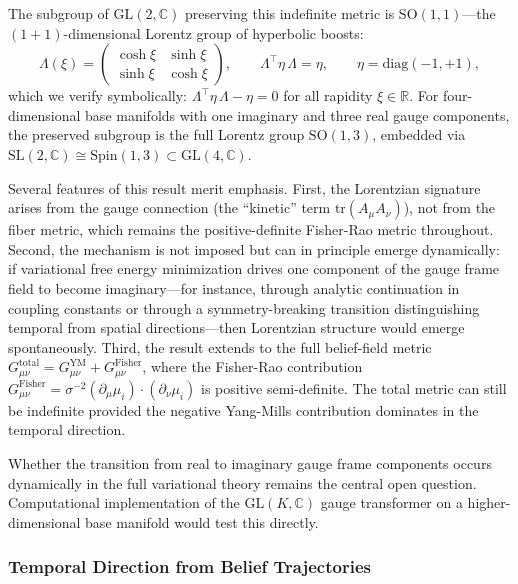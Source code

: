 \documentclass[11pt]{article}
\begin{document}
The subgroup of $\mathrm{GL}(2, \mathbb{C})$ preserving this indefinite metric is $\mathrm{SO}(1,1)$---the $(1{+}1)$-dimensional Lorentz group of hyperbolic boosts:
\begin{equation}
\Lambda(\xi) = \begin{pmatrix} \cosh\xi & \sinh\xi \\ \sinh\xi & \cosh\xi \end{pmatrix}, \qquad \Lambda^\top \eta\,\Lambda = \eta, \qquad \eta = \mathrm{diag}(-1, +1),
\end{equation}
which we verify symbolically: $\Lambda^\top \eta\,\Lambda - \eta = 0$ for all rapidity $\xi \in \mathbb{R}$. For four-dimensional base manifolds with one imaginary and three real gauge components, the preserved subgroup is the full Lorentz group $\mathrm{SO}(1,3)$, embedded via $\mathrm{SL}(2, \mathbb{C}) \cong \mathrm{Spin}(1,3) \subset \mathrm{GL}(4, \mathbb{C})$.

Several features of this result merit emphasis. First, the Lorentzian signature arises from the gauge connection (the ``kinetic'' term $\mathrm{tr}(A_\mu A_\nu)$), not from the fiber metric, which remains the positive-definite Fisher-Rao metric throughout. Second, the mechanism is not imposed but can in principle emerge dynamically: if variational free energy minimization drives one component of the gauge frame field to become imaginary---for instance, through analytic continuation in coupling constants or through a symmetry-breaking transition distinguishing temporal from spatial directions---then Lorentzian structure would emerge spontaneously. Third, the result extends to the full belief-field metric $G_{\mu\nu}^{\mathrm{total}} = G_{\mu\nu}^{\mathrm{YM}} + G_{\mu\nu}^{\mathrm{Fisher}}$, where the Fisher-Rao contribution $G_{\mu\nu}^{\mathrm{Fisher}} = \sigma^{-2}(\partial_\mu \mu_i) \cdot (\partial_\nu \mu_i)$ is positive semi-definite. The total metric can still be indefinite provided the negative Yang-Mills contribution dominates in the temporal direction.

Whether the transition from real to imaginary gauge frame components occurs dynamically in the full variational theory remains the central open question. Computational implementation of the $\mathrm{GL}(K, \mathbb{C})$ gauge transformer on a higher-dimensional base manifold would test this directly.

\subsubsection{Temporal Direction from Belief Trajectories}
\end{document}
